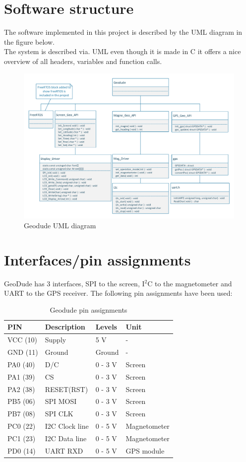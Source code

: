 \section{Software structure}
The software implemented in this project is described by the UML diagram in the figure below.\\
The system is described via. UML even though it is made in C it offers a nice overview of all headers, variables and function calls.
\begin{figure}[hbpt]
\centering
\includegraphics[width=1\textwidth]{billeder/geodude_UML}
\caption{Geodude UML diagram}
\end{figure}


\section{Interfaces/pin assignments}
GeoDude has 3 interfaces, SPI to the screen, I$^2$C to the magnetometer and UART to the GPS receiver.
The following pin assignments have been used:
\begin{table}[H]
\centering
    \begin{tabular}{|l|l|l|l|}
    \hline
    PIN 		& Description    & Levels 	& Unit  \\ \hline
    VCC (10) 	& Supply         & 5 V    	& -		\\ \hline
    GND (11) 	& Ground         & Ground  	& -		\\ \hline
    PA0 (40)	& D/C			 & 0 - 3 V	& Screen \\ \hline
    PA1 (39)	& CS			 & 0 - 3 V  & Screen \\ \hline
    PA2 (38)	& RESET(RST)	 & 0 - 3 V  & Screen \\ \hline
    PB5	(06)	& SPI MOSI		 & 0 - 3 V  & Screen \\ \hline
    PB7 (08)	& SPI CLK		 & 0 - 3 V  & Screen \\ \hline
    PC0 (22) 	& I2C Clock line & 0 - 5 V 	& Magnetometer 	\\ \hline
    PC1 (23) 	& I2C Data line  & 0 - 5 V 	& Magnetometer		\\ \hline
    PD0 (14)	& UART RXD		 & 0 - 5 V	& GPS module \\ \hline
    \end{tabular}
    \caption{Geodude pin assignments}
\end{table}


